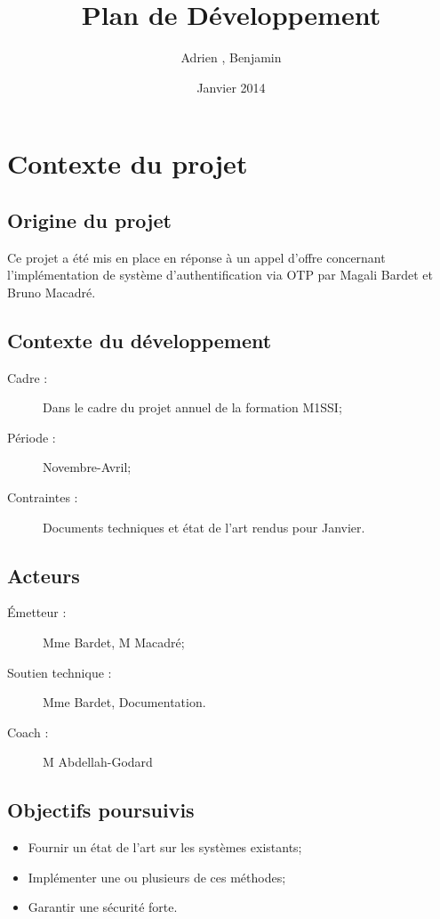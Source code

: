 \documentclass{../../res/univ-projet}
\title{Plan de Développement}
\author{Adrien \bsc{Smondack}, Benjamin \bsc{Zigh}}
\date{Janvier 2014}
\begin{document}
\maketitle

\section{Contexte du projet}
	\subsection{Origine du projet}
	Ce projet a été mis en place en réponse à un appel d'offre concernant 
	l'implémentation de système d'authentification via OTP par Magali Bardet et 
	Bruno Macadré.
	
	\subsection{Contexte du développement}
	\begin{description} 
		\item [Cadre :] Dans le cadre du projet annuel de la formation M1SSI;
		\item [Période :] Novembre-Avril;
		\item [Contraintes :] Documents techniques et état de l'art rendus pour Janvier.
	\end{description}

	\subsection{Acteurs}
	\begin{description}
		\item [Émetteur :] Mme Bardet, M Macadré;
		\item [Soutien technique :] Mme Bardet, Documentation.
		\item [Coach :] M Abdellah-Godard
	\end{description}

	\subsection{Objectifs poursuivis}
	\begin{itemize}
		\item Fournir un état de l'art sur les systèmes existants;
		\item Implémenter une ou plusieurs de ces méthodes;
		\item Garantir une sécurité forte.
	\end{itemize}
\end{document}
